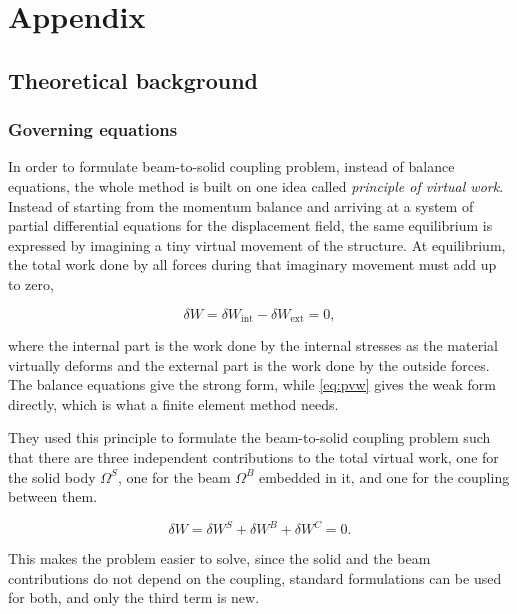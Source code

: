 \section{Appendix}
\label{app:appendix}

\FloatBarrier
\subsection{Theoretical background}
\label{app:theory}

\subsubsection{Governing equations}
\label{sec:governing-equations}

In order to formulate beam-to-solid coupling problem, instead of balance equations, the whole method is built on one idea called \emph{principle of virtual work}. Instead of starting from the momentum balance and arriving at a system of partial differential equations for the displacement field, the same equilibrium is expressed by imagining a tiny virtual movement of the structure. At equilibrium, the total work done by all forces during that imaginary movement must add up to zero,

\begin{equation}
  \delta W = \delta W_\mathrm{int} - \delta W_\mathrm{ext} = 0 , \label{eq:pvw}
\end{equation}

where the internal part is the work done by the internal stresses as the material virtually deforms and the external part is the work done by the outside forces. The balance equations give the strong form, while \cref{eq:pvw} gives the weak form directly, which is what a finite element method needs.

They used this principle to formulate the beam-to-solid coupling problem such that there are three independent contributions to the total virtual work, one for the solid body $\Omega^S$, one for the beam $\Omega^B$ embedded in it, and one for the coupling between them.

\begin{equation}
  \delta W = \delta W^S + \delta W^B + \delta W^C = 0 . \label{eq:split}
\end{equation}

This makes the problem easier to solve, since the solid and the beam contributions do not depend on the coupling, standard formulations can be used for both, and only the third term is new.

